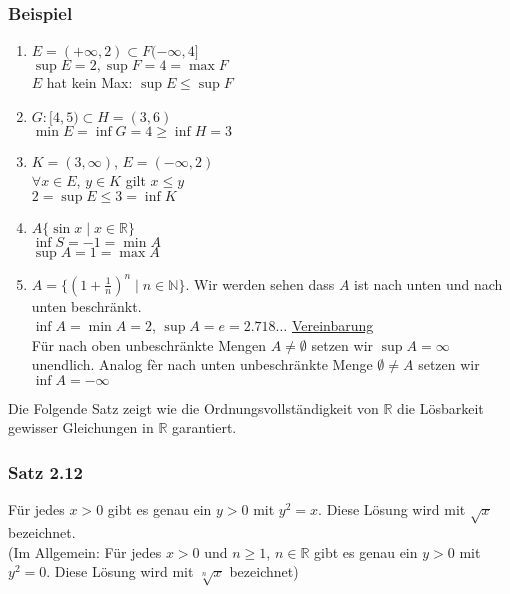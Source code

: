 \subsubsection*{Beispiel}
\begin{enumerate}
\item $E=(+\infty,2)\subset F(-\infty,4\rbrack$\\
$\sup E=2, \sup F=4=\max F$\\
$E$ hat kein Max: $\sup E\leq \sup F$
\item $G:\lbrack 4,5)\subset H=(3,6)$\\
$\min E=\inf G=4\geq \inf H=3$
\item $K=(3,\infty)$, $E=(-\infty,2)$\\
$\forall x\in E$, $y\in K$ gilt $x\leq y$\\
$2=\sup E\leq 3=\inf K$
\item $A\{\sin x\mid x\in\mathbb{R}\}$\\
$\inf S=-1=\min A$\\
$\sup A=1=\max A$
\item $A=\{\left( 1+\frac{1}{n}\right)^n\mid n\in\mathbb{N} \}$. Wir werden sehen dass $A$ ist nach unten und nach unten beschränkt. \\
$\inf A=\min A=2$, $\sup A=e=2.718\dots$
\underline{Vereinbarung}\\
Für nach oben unbeschränkte Mengen $A\not=\emptyset$ setzen wir $\sup A=\infty$ unendlich. Analog fèr nach unten unbeschränkte Menge $\emptyset\not= A$ setzen wir $\inf A=-\infty$ 
\end{enumerate}
Die Folgende Satz zeigt wie die Ordnungsvollständigkeit von $\mathbb{R}$ die Lösbarkeit gewisser Gleichungen in $\mathbb{R}$ garantiert.

\subsubsection*{Satz 2.12}
Für jedes $x>0$ gibt es genau ein $y>0$ mit $y^2=x$. Diese Lösung wird mit $\sqrt{x}$ bezeichnet.\\

(Im Allgemein: Für jedes $x>0$ und $n\geq 1$, $n\in\mathbb{R}$ gibt es genau ein $y>0$ mit $y^2=0$. Diese Lösung wird mit $\sqrt[n]{x}$ bezeichnet)

